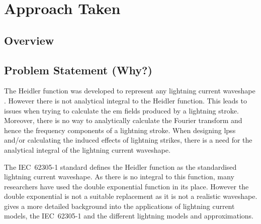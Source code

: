
\chapter{Approach Taken} %

\label{ChapterApproach} %

\begin{quote}
\end{quote}


\section{Overview}
\label{sec:approach_overview}



\section{Problem Statement (Why?)}
\label{sec:approach_problem_statement}
The Heidler function was developed to represent any lightning current waveshape \cite{Heidler2002}. However there is not analytical integral to the Heidler function. This leads to issues when trying to calculate the \gls{em} fields produced by a lightning stroke. Moreover, there is no way to analytically calculate the Fourier transform and hence the frequency components of a lightning stroke. When designing \glspl{lps} and/or calculating the induced effects of lightning strikes, there is a need for the analytical integral of the lightning current waveshape.

The IEC~62305-1 standard defines the Heidler function as the standardised lightning current waveshape. As there is no integral to this function, many researchers have used the double exponential function in its place. However the double exponential is not a suitable replacement as it is not a realistic waveshape.  gives a more detailed background into the applications of lightning current models, the IEC~62305-1 and the different lightning models and approximations.

